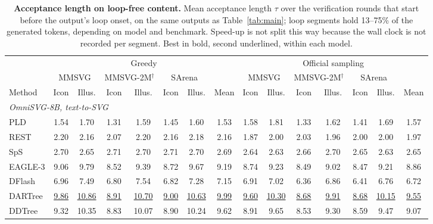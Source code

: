 \begin{table}[t]
\caption{\textbf{Acceptance length on loop-free content.} Mean acceptance length $\tau$ over the verification rounds that start before the output's loop onset, on the same outputs as Table~\ref{tab:main}; loop segments hold 13--75\% of the generated tokens, depending on model and benchmark. Speed-up is not split this way because the wall clock is not recorded per segment. Best in bold, second underlined, within each model.}
\label{app:t1-healthy}
\centering
\footnotesize
\setlength{\tabcolsep}{2.2pt}
\begin{tabular*}{\textwidth}{@{\extracolsep{\fill}}l*{14}{c}@{}}
\toprule
 & \multicolumn{7}{c}{Greedy} & \multicolumn{7}{c}{Official sampling} \\
\cmidrule(lr){2-8}\cmidrule(lr){9-15}
 & \multicolumn{2}{c}{MMSVG} & \multicolumn{2}{c}{MMSVG-2M$^\dagger$} & \multicolumn{2}{c}{SArena} & & \multicolumn{2}{c}{MMSVG} & \multicolumn{2}{c}{MMSVG-2M$^\dagger$} & \multicolumn{2}{c}{SArena} & \\
\cmidrule(lr){2-3}\cmidrule(lr){4-5}\cmidrule(lr){6-7}\cmidrule(lr){9-10}\cmidrule(lr){11-12}\cmidrule(lr){13-14}
Method & Icon & Illus. & Icon & Illus. & Icon & Illus. & Mean & Icon & Illus. & Icon & Illus. & Icon & Illus. & Mean \\
\midrule
\multicolumn{15}{l}{\textit{OmniSVG-8B, text-to-SVG}} \\
PLD & 1.54 & 1.70 & 1.31 & 1.59 & 1.45 & 1.60 & 1.53 & 1.58 & 1.81 & 1.33 & 1.62 & 1.41 & 1.69 & 1.57 \\
REST & 2.20 & 2.16 & 2.07 & 2.20 & 2.16 & 2.18 & 2.16 & 1.87 & 2.00 & 2.03 & 1.96 & 2.00 & 2.00 & 1.97 \\
SpS & 2.70 & 2.65 & 2.71 & 2.70 & 2.71 & 2.70 & 2.69 & 2.64 & 2.63 & 2.66 & 2.70 & 2.65 & 2.63 & 2.65 \\
EAGLE-3 & 9.06 & 9.79 & 8.52 & 9.39 & 8.72 & 9.67 & 9.19 & 8.74 & 9.23 & 8.49 & 9.02 & 8.47 & 9.21 & 8.86 \\
DFlash & 6.96 & 7.49 & 6.80 & 7.54 & 6.82 & 7.28 & 7.15 & 6.91 & 7.02 & 6.36 & 6.86 & 6.41 & 6.76 & 6.72 \\
DARTree & \underline{9.86} & \underline{10.86} & \underline{8.91} & \underline{10.70} & \underline{9.00} & \underline{10.63} & \underline{9.99} & \underline{9.60} & \underline{10.30} & \underline{8.68} & \underline{9.91} & \underline{8.68} & \underline{10.15} & \underline{9.55} \\
DDTree & 9.32 & 10.35 & 8.83 & 10.07 & 8.90 & 10.24 & 9.62 & 8.91 & 9.65 & 8.53 & 9.30 & 8.59 & 9.47 & 9.07 \\

\end{tabular*}
\end{table}
